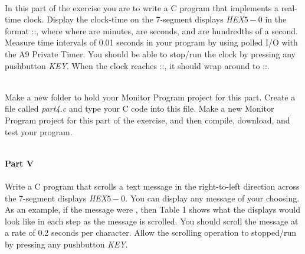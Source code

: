 \documentclass[epsfig,10pt,fullpage]{article}
\begin{document}
~\\
\noindent
In this part of the exercise you are to write a C program that implements a real-time
clock. Display the clock-time on the 7-segment displays {\it HEX}$5-0$
in the format ::, where 
where  are minutes,  are seconds, and  are hundredths of 
a second.  Measure time intervals of 0.01 seconds in your program by using polled I/O with the A9 
Private Timer.  You should be able to stop/run the clock by pressing any pushbutton {\it KEY}.
When the clock reaches ::, it should wrap around to
::.

~\\
\noindent
Make a new folder to hold your Monitor Program project for this part. Create a
file called {\it part4.c} and type your C code into this file.  Make a new Monitor Program 
project for this part of the exercise, and then compile, download, and test your program. 

~\\
\noindent
{\bf Part V}
~\\
~\\
\noindent
Write a C program that scrolls a text message in the right-to-left direction across the 
7-segment displays {\it HEX}$5-0$. You can display any message of your choosing. As an
example, if the message were , then Table 1 shows what the displays would 
look like in each step as the message is scrolled. You should scroll the message at a rate of 
0.2 seconds per character. Allow the scrolling operation to stopped/run by pressing
any pushbutton {\it KEY}.
\end{document}
